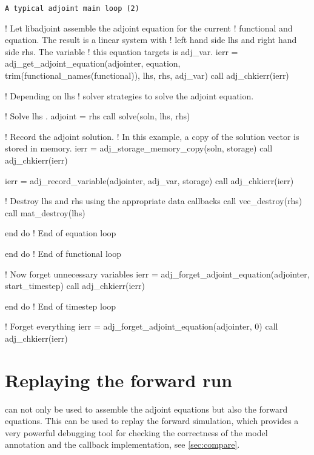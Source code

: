 \begin{boxwithtitle}{\texttt{A typical adjoint main loop (2)}}
\begin{minipage}{\columnwidth}
\begin{fortrancode}   
        ! Let libadjoint assemble the adjoint equation for the current 
        ! functional and equation. The result is a linear system with 
        ! left hand side lhs and right hand side rhs. The variable 
        ! this equation targets is adj_var. 
        ierr = adj_get_adjoint_equation(adjointer, equation, 
                                        trim(functional_names(functional)), 
                                        lhs, rhs, adj_var)
        call adj_chkierr(ierr)

        ! Depending on lhs%
        ! solver strategies to solve the adjoint equation.

        ! Solve lhs . adjoint = rhs 
        call solve(soln, lhs, rhs)

        ! Record the adjoint solution. 
        ! In this example, a copy of the solution vector is stored in memory.
        ierr = adj_storage_memory_copy(soln, storage)
        call adj_chkierr(ierr)

        ierr = adj_record_variable(adjointer, adj_var, storage)
        call adj_chkierr(ierr)

        ! Destroy lhs and rhs using the appropriate data callbacks
        call vec_destroy(rhs)
        call mat_destroy(lhs)

      end do ! End of equation loop
      
    end do ! End of functional loop

    ! Now forget unnecessary variables
    ierr = adj_forget_adjoint_equation(adjointer, start_timestep)
    call adj_chkierr(ierr)

  end do ! End of timestep loop

  ! Forget everything
  ierr = adj_forget_adjoint_equation(adjointer, 0)
  call adj_chkierr(ierr)
\end{fortrancode}
\end{minipage}
\end{boxwithtitle}


\section{Replaying the forward run} \label{sec:replay}

\libadjoint can not only be used to assemble the adjoint equations but also the forward equations. 
This can be used to replay the forward simulation, which provides a very powerful debugging tool for checking the correctness of the model annotation and the callback implementation, see \autoref{sec:compare}.

